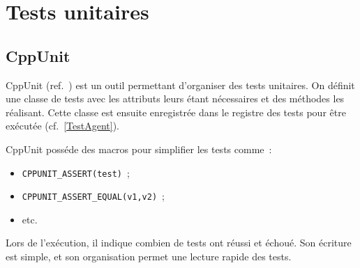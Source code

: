\section{Tests unitaires}
\subsection{CppUnit}
CppUnit (ref.~\cite{CppUnit}) est un outil permettant d'organiser des tests unitaires.
On définit une classe de tests avec les attributs leurs étant nécessaires et des méthodes les réalisant. Cette classe est ensuite enregistrée dans le registre des tests pour être exécutée (cf.~\ref{TestAgent}).

CppUnit posséde des macros pour simplifier les tests comme~:
\begin{itemize}
\item \verb|CPPUNIT_ASSERT(test)|~;
\item \verb|CPPUNIT_ASSERT_EQUAL(v1,v2)|~;
\item etc.
\end{itemize}

Lors de l'exécution, il indique combien de tests ont réussi et échoué.
Son écriture est simple, et son organisation permet une lecture rapide des tests.

